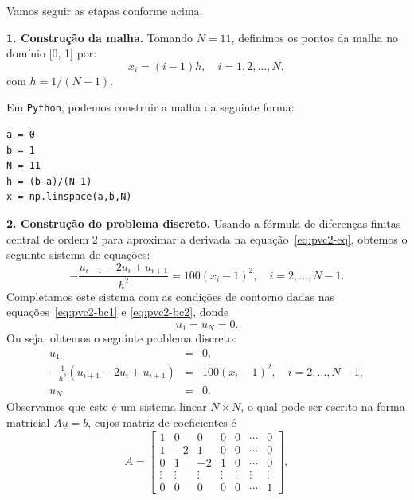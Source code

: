 \begin{sol} Vamos seguir as etapas conforme acima.

  {\bf 1. Construção da malha.} Tomando $N=11$, definimos os pontos da malha no domínio [0, 1] por:
  \begin{equation*}
    x_i = (i-1)h,\quad i=1, 2, \dotsc, N,
  \end{equation*}
com $h = 1/(N-1)$.

\ifispython
Em \verb+Python+, podemos construir a malha da seguinte forma:
\begin{verbatim}
a = 0
b = 1
N = 11
h = (b-a)/(N-1)
x = np.linspace(a,b,N)
\end{verbatim}
\fi

{\bf 2. Construção do problema discreto.} Usando a fórmula de diferenças finitas central de ordem 2 para aproximar a derivada na equação~\eqref{eq:pvc2-eq}, obtemos o seguinte sistema de equações:
\begin{equation*}
  - \frac{u_{i-1} - 2u_i + u_{i+1}}{h^2} = 100(x_i - 1)^2,\quad i = 2, \dotsc, N-1.
\end{equation*}
Completamos este sistema com as condições de contorno dadas nas equações~\eqref{eq:pvc2-bc1} e \eqref{eq:pvc2-bc2}, donde
\begin{equation*}
  u_1 = u_N = 0.
\end{equation*}
Ou seja, obtemos o seguinte problema discreto:
\begin{eqnarray}
  u_1 &=& 0,\label{eq:pvc2_disc_bc1}\\
  -\frac{1}{h^2}\left(u_{i+1} - 2u_i + u_{i+1}\right) &=& 100(x_i-1)^2,\quad i=2, \dotsc, N-1,\\
  u_N &=& 0.\label{eq:pvc2_disc_bc2}
\end{eqnarray}
Observamos que este é um sistema linear $N\times N$, o qual pode ser escrito na forma matricial $A\underline{u} = b$, cujos matriz de coeficientes é
\begin{equation*}
  A = 
  \begin{bmatrix}
    1 & 0 & 0 & 0 & 0 & \cdots & 0\\
    1 & -2 & 1 & 0 & 0 & \cdots & 0\\
    0 & 1 & -2 & 1 & 0 & \cdots & 0\\
    \vdots & \vdots & \vdots & \vdots & \vdots & \vdots & \vdots\\
    0 & 0 & 0 & 0 & 0 & \cdots & 1
  \end{bmatrix},
\end{equation*}

\end{sol}
